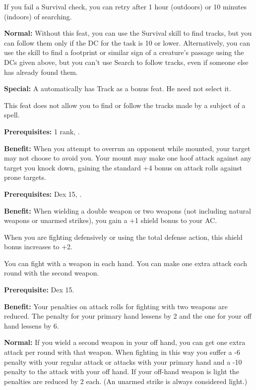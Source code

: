 If you fail a Survival check, you can retry after 1 hour (outdoors) or 10 minutes 
(indoors) of searching.

\textbf{Normal:} Without this feat, you can use the Survival skill to find tracks, 
but you can follow them only if the DC for the task is 10 or lower. Alternatively, 
you can use the  skill to find a footprint or similar sign of a creature's 
passage using the DCs given above, but you can't use Search to follow tracks, even 
if someone else has already found them.

\textbf{Special:} A  automatically has Track as a bonus feat. He need not 
select it.

This feat does not allow you to find or follow the tracks made by a subject of 
a  spell.


\textbf{Prerequisites:}  1 rank, .

\textbf{Benefit:} When you attempt to overrun an opponent while mounted, your target 
may not choose to avoid you. Your mount may make one hoof attack against any target 
you knock down, gaining the standard +4 bonus on attack rolls against prone targets.


\textbf{Prerequisites:} Dex 15, .

\textbf{Benefit:} When wielding a double weapon or two weapons (not including natural 
weapons or unarmed strikes), you gain a +1 shield bonus to your AC.

When you are fighting defensively or using the total defense action, this shield 
bonus increases to +2.


You can fight with a weapon in each hand. You can make one extra attack each round 
with the second weapon.

\textbf{Prerequisite:} Dex 15.

\textbf{Benefit:} Your penalties on attack rolls for fighting with two weapons 
are reduced. The penalty for your primary hand lessens by 2 and the one for your 
off hand lessens by 6.

\textbf{Normal:} If you wield a second weapon in your off hand, you can get one 
extra attack per round with that weapon. When fighting in this way you suffer a 
-6 penalty with your regular attack or attacks with your primary hand and a -10 
penalty to the attack with your off hand. If your off-hand weapon is light the 
penalties are reduced by 2 each. (An unarmed strike is always considered light.)

